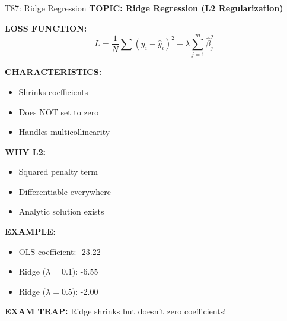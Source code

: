 \documentclass[8pt]{beamer}
\begin{document}
	\begin{frame}{T87: Ridge Regression}
		\fontsize{6.5}{7.5}\selectfont
		\textbf{TOPIC: Ridge Regression (L2 Regularization)}
		
		\vspace{0.1cm}
		\textbf{LOSS FUNCTION:}
		\[
		L = \frac{1}{N}\sum(y_i - \hat{y}_i)^2 + \lambda \sum_{j=1}^m \hat{\beta}_j^2
		\]
		
		\vspace{0.1cm}
		\textbf{CHARACTERISTICS:}
		\begin{itemize}
			\item Shrinks coefficients
			\item Does NOT set to zero
			\item Handles multicollinearity
		\end{itemize}
		
		\vspace{0.1cm}
		\textbf{WHY L2:}
		\begin{itemize}
			\item Squared penalty term
			\item Differentiable everywhere
			\item Analytic solution exists
		\end{itemize}
		
		\vspace{0.1cm}
		\textbf{EXAMPLE:}
		\begin{itemize}
			\item OLS coefficient: -23.22
			\item Ridge ($\lambda=0.1$): -6.55
			\item Ridge ($\lambda=0.5$): -2.00
		\end{itemize}
		
		\textcolor{myred}{\textbf{EXAM TRAP:}} Ridge \textcolor{myblue}{shrinks but doesn't zero} coefficients!
	\end{frame}
	
\end{document}
